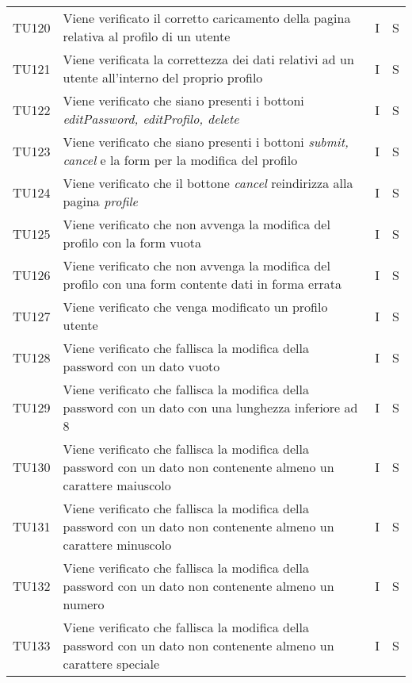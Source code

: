 {\begin{longtable}{C{2cm} C{9.6cm} C{1.5cm} C{1cm}}
TU120 & Viene verificato il corretto caricamento della pagina relativa al profilo di un utente & I & S\\

TU121 & Viene verificata la correttezza dei dati relativi ad un utente all'interno del proprio profilo & I & S\\

TU122 & Viene verificato che siano presenti i bottoni \textit{editPassword, editProfilo, delete} & I & S\\

TU123 & Viene verificato che siano presenti i bottoni \textit{submit, cancel} e la form per la modifica del profilo & I & S\\

TU124 & Viene verificato che il bottone \textit{cancel} reindirizza alla pagina \textit{profile} & I & S\\

TU125 & Viene verificato che non avvenga la modifica del profilo con la form vuota & I & S\\

TU126 & Viene verificato che non avvenga la modifica del profilo con una form contente dati in forma errata & I & S\\

TU127 & Viene verificato che venga modificato un profilo utente & I & S\\

TU128 & Viene verificato che fallisca la modifica della password con un dato vuoto & I & S\\

TU129 & Viene verificato che fallisca la modifica della password con un dato con una lunghezza inferiore ad 8 & I & S\\

TU130 & Viene verificato che fallisca la modifica della password con un dato non contenente almeno un carattere maiuscolo & I & S\\


TU131 & Viene verificato che fallisca la modifica della password con un dato non contenente almeno un carattere minuscolo & I & S\\

TU132 & Viene verificato che fallisca la modifica della password con un dato non contenente almeno un numero & I & S\\

TU133 & Viene verificato che fallisca la modifica della password con un dato non contenente almeno un carattere speciale & I & S\\


\end{longtable}}
